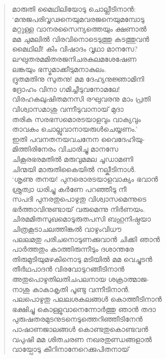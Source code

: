\begin{verse}
മാരുതി മൈഥിലിയോടു ചൊല്ലീടിനാന്‍:\\
‘മനുജപരിവൃഢനെയുമവരജനെയുമമ്പോടു\\
മറ്റുള്ള വാനരസൈന്യത്തെയും ക്ഷണാല്‍\\
മമ ചുമലില്‍ വിരവിനൊടെടുത്തു കടത്തുവന്‍\\
മൈഥിലീ! കിം വിഷാദം വൃഥാ മാനസേ?\\
ലഘുതരമമിതരജനിചരകുലമശേഷേണ\\
ലങ്കയും ഭസ്മമാക്കീടുമനാകുലം.\\
ദ്രുതമതിനു സുതനു! മമ ദേഹ്യനുജ്ഞാമിനി\\
ദ്രോഹം വിനാ ഗമിച്ചീടുവനോമലേ!\\
വിരഹകലുഷിതമനസി രഘുവരനു മാം പ്രതി\\
വിശ്വാസമാശു വന്നീടുവാനായ് മുദാ\\
തരിക സരഭസമൊരടയാളവും വാക്യവും\\
താവകം ചൊല്ലുവാനായരുള്‍ചെയ്യണം.’\\
ഇതി പവനതനയവചനേന വൈദേഹിയു-\\
മിത്തിരിനേരം വിചാരിച്ചു മാനസേ\\
ചികൂരഭരമതില്‍ മരുവുമമല ചൂഡാമണി\\
ചിന്മയി മാരുതികൈയില്‍ നല്കീടിനാള്‍.\\
‘ശൃണു തനയ! പുനരൊരടയാളവാക്യം ഭവാന്‍\\
ശ്രുത്വാ ധരിച്ചു കര്‍ണേ പറഞ്ഞീടു നീ\\
സപദി പുനരതുപൊഴുതു വിശ്വാസമെന്നുടെ\\
ഭര്‍ത്താവിനുണ്ടായ് വരുമെന്നു നിര്‍ണയം.\\
ചിരമമിതസുഖമൊടുരുതപസി ബഹുനിഷ്ഠയാ\\
ചിത്രകൂടാചലത്തിങ്കല്‍ വാഴുംവിധൗ\\
പലലമതു പരിചനൊടുണക്കുവാന്‍ ചിക്കി ഞാന്‍\\
പാര്‍ത്തതും കാത്തിരുന്നീടും ദശാന്തരേ\\
തിരുമുടിയുമഴകിനൊടു മടിയില്‍ മമ വെച്ചുടന്‍\\
തീര്‍ഥപാദന്‍ വിരവോടുറങ്ങീടിനാന്‍\\
അതുപൊഴുതിലതിചപലനായ ശക്രാത്മാജ-\\
നാശു കാകാകൃതി പൂണ്ടു വന്നീടിനാന്‍.\\
പലപൊഴുതു പലലശകലങ്ങള്‍ കൊത്തീടിനാന്‍\\
ഭക്ഷിച്ചു കൊള്ളുവാനെന്നോര്‍ത്തു ഞാന്‍ തദാ\\
പുരുഷതരമുടനുടനെടുത്തെറിഞ്ഞീടിനേന്‍\\
പാഷാണജാലങ്ങള്‍ കൊണ്ടതുകൊണ്ടവന്‍\\
വപുഷി മമ ശിതചരണ നഖരതുണ്ഡങ്ങളാല്‍\\
വായ്പോടു കീറിനാനേറെക്കുപിതനായ്\\

\end{verse}
